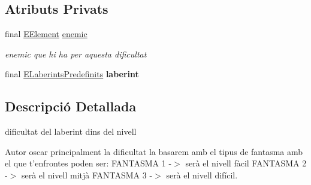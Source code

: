 \subsection*{Atributs Privats}
\begin{DoxyCompactItemize}
\item 
\hypertarget{enumlogica_1_1_usuari_1_1_e_dificultat_ad8be0bd10f87048f7545bbfa4530463c}{final \hyperlink{enumlogica_1_1enumeracions_1_1_e_element}{E\+Element} \hyperlink{enumlogica_1_1_usuari_1_1_e_dificultat_ad8be0bd10f87048f7545bbfa4530463c}{enemic}}\label{enumlogica_1_1_usuari_1_1_e_dificultat_ad8be0bd10f87048f7545bbfa4530463c}

\begin{DoxyCompactList}\small\item\em enemic que hi ha per aquesta dificultat \end{DoxyCompactList}\item 
\hypertarget{enumlogica_1_1_usuari_1_1_e_dificultat_ab632a7141d99a8f4ef1480c19bdd1b06}{final \hyperlink{enumlogica_1_1enumeracions_1_1_e_laberints_predefinits}{E\+Laberints\+Predefinits} {\bfseries laberint}}\label{enumlogica_1_1_usuari_1_1_e_dificultat_ab632a7141d99a8f4ef1480c19bdd1b06}

\end{DoxyCompactItemize}


\subsection{Descripció Detallada}
dificultat del laberint dins del nivell 

\begin{DoxyAuthor}{Autor}
oscar principalment la dificultat la basarem amb el tipus de fantasma amb el que t'enfrontes poden ser\+: F\+A\+N\+T\+A\+S\+M\+A 1 -\/$>$ serà el nivell fàcil F\+A\+N\+T\+A\+S\+M\+A 2 -\/$>$ serà el nivell mitjà F\+A\+N\+T\+A\+S\+M\+A 3 -\/$>$ serà el nivell difícil. 
\end{DoxyAuthor}


